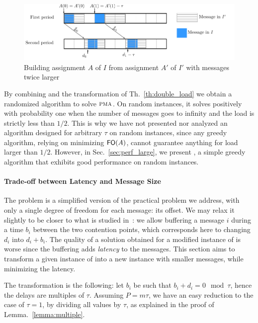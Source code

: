 \documentclass[pdflatex,sn-mathphys,iicol]{sn-jnl}%
\theoremstyle{thmstyleone}%
\theoremstyle{thmstyletwo}%
\theoremstyle{thmstylethree}%
\begin{document}
\begin{figure}[h]
\begin{center}

\includegraphics[scale=0.7]{transfo2tau}
\end{center}
\caption{Building assignment $A$ of $I$ from assignment $A'$ of $I'$ with messages twice larger}
\label{fig:transf_2tau}
\end{figure}
 

By combining \greedyuniform and the transformation of Th.~\ref{th:double_load} we obtain a randomized algorithm to solve $\textsc{pma}$. On random instances, it solves \pma positively with probability one when the number of messages goes to infinity and the load is strictly less than $1/2$. This is why we have not presented nor analyzed an algorithm designed for arbitrary $\tau$ on random instances, since any greedy algorithm, relying on minimizing $\textsf{FO}(A)$, cannot guarantee anything for load larger than $1/2$. However, in Sec.~\ref{sec:perf_large}, we present \compactfit, a simple greedy algorithm that exhibits good performance on random instances.

\paragraph*{Trade-off between Latency and Message Size}

The problem \pma is a simplified version of the practical problem we address, with only a single degree of freedom for each message: its offset. We may relax it slightly to be closer to what is studied in~\cite{barth2018deterministic}: we allow buffering a message $i$ during a time $b_i$ between the two contention points, which corresponds here to changing $d_i$ into $d_i + b_i$. The quality of a solution obtained for a modified instance of \pma is worse since the buffering adds \emph{latency} to the messages. This section aims to transform a given instance of \pma into a new instance with smaller messages, while minimizing the latency.

The transformation is the following: let $b_i$ be such that 
 $b_i + d_i = 0 \mod \tau$, hence the delays are multiples of $\tau$. Assuming $P = m\tau$, we have an easy reduction to the case of $\tau = 1$, by dividing all values by $\tau$, as explained in the proof of Lemma.~\ref{lemma:multiple}. 
\end{document}
